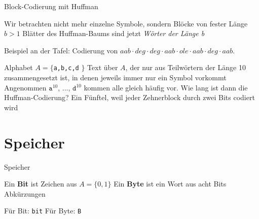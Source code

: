 \begin{frame}{Block-Codierung mit Huffman}
	\begin{itemize}
		\pitem Wir betrachten nicht mehr einzelne Symbole, sondern Blöcke von fester Länge $b > 1$
		\pitem Blätter des Huffman-Baums sind jetzt \textit{Wörter der Länge b}
	\end{itemize}

	\vspace{.5cm}
	
	Beispiel an der Tafel: Codierung von $aab\cdot deg \cdot deg \cdot aab \cdot ole \cdot aab \cdot deg \cdot aab$.\p
	
	\vspace{.5cm}
	
	\p
	\begin{itemize}
		\pitem Alphabet $A =\{$\texttt{a,b,c,d} $\}$
		\pitem Text über $A$, der nur aus Teilwörtern der Länge 10 zusammengesetzt ist, in denen jeweils immer nur ein Symbol vorkommt
		\pitem Angenommen $\texttt{a}^{10}$, ..., $\texttt{d}^{10}$ kommen alle gleich häufig vor. Wie lang ist dann die Huffman-Codierung? \pause
		\pitem[$\rightarrow$] Ein Fünftel, weil jeder Zehnerblock durch zwei Bits codiert wird
	\end{itemize}
	
\end{frame}



\section{Speicher}


\begin{frame}{Speicher}
	\begin{itemize}
		\pitem Ein \textbf{Bit} ist Zeichen aus $A = \{0, 1\}$
		\pitem Ein \textbf{Byte} ist ein Wort aus acht Bits
		\pitem Abkürzungen
		\begin{itemize}
			\pitem Für Bit: \texttt{bit}
			\pitem Für Byte: \texttt{B}
		\end{itemize}
	\end{itemize}
\end{frame}

